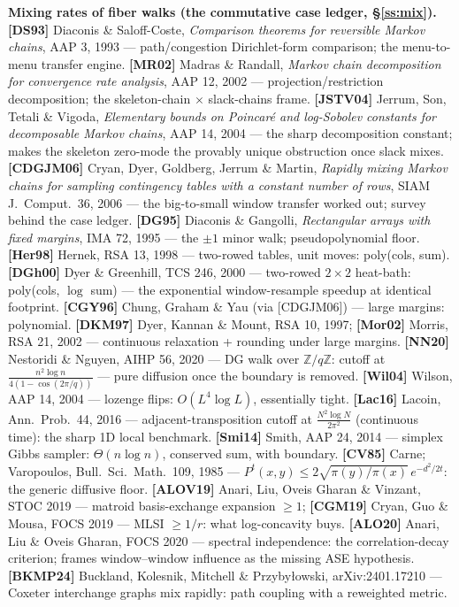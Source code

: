 \documentclass[11pt]{article}
\begin{document}
\textbf{Mixing rates of fiber walks (the commutative case ledger, \S\ref{ss:mix}).}
\textbf{[DS93]} Diaconis \& Saloff-Coste, \emph{Comparison theorems for reversible Markov chains},
AAP 3, 1993 --- path/congestion Dirichlet-form comparison; the menu-to-menu transfer engine.
\textbf{[MR02]} Madras \& Randall, \emph{Markov chain decomposition for convergence rate analysis},
AAP 12, 2002 --- projection/restriction decomposition; the skeleton-chain $\times$ slack-chains frame.
\textbf{[JSTV04]} Jerrum, Son, Tetali \& Vigoda, \emph{Elementary bounds on Poincar\'e and
log-Sobolev constants for decomposable Markov chains}, AAP 14, 2004 --- the sharp decomposition
constant; makes the skeleton zero-mode the provably unique obstruction once slack mixes.
\textbf{[CDGJM06]} Cryan, Dyer, Goldberg, Jerrum \& Martin, \emph{Rapidly mixing Markov chains for
sampling contingency tables with a constant number of rows}, SIAM J.\ Comput.\ 36, 2006 --- the
big-to-small window transfer worked out; survey behind the case ledger.
\textbf{[DG95]} Diaconis \& Gangolli, \emph{Rectangular arrays with fixed margins}, IMA 72, 1995 ---
the $\pm1$ minor walk; pseudopolynomial floor.
\textbf{[Her98]} Hernek, RSA 13, 1998 --- two-rowed tables, unit moves: poly(cols, sum).
\textbf{[DGh00]} Dyer \& Greenhill, TCS 246, 2000 --- two-rowed $2\times2$ heat-bath: poly(cols,
$\log$ sum) --- the exponential window-resample speedup at identical footprint.
\textbf{[CGY96]} Chung, Graham \& Yau (via [CDGJM06]) --- large margins: polynomial.
\textbf{[DKM97]} Dyer, Kannan \& Mount, RSA 10, 1997; \textbf{[Mor02]} Morris, RSA 21, 2002 ---
continuous relaxation + rounding under large margins.
\textbf{[NN20]} Nestoridi \& Nguyen, AIHP 56, 2020 --- DG walk over $\mathbb{Z}/q\mathbb{Z}$: cutoff
at $\frac{n^2\log n}{4(1-\cos(2\pi/q))}$ --- pure diffusion once the boundary is removed.
\textbf{[Wil04]} Wilson, AAP 14, 2004 --- lozenge flips: $O(L^4\log L)$, essentially tight.
\textbf{[Lac16]} Lacoin, Ann.\ Prob.\ 44, 2016 --- adjacent-transposition cutoff at
$\frac{N^2\log N}{2\pi^2}$ (continuous time): the sharp 1D local benchmark.
\textbf{[Smi14]} Smith, AAP 24, 2014 --- simplex Gibbs sampler: $\Theta(n\log n)$, conserved sum,
with boundary.
\textbf{[CV85]} Carne; Varopoulos, Bull.\ Sci.\ Math.\ 109, 1985 --- $P^t(x,y)\le
2\sqrt{\pi(y)/\pi(x)}\,e^{-d^2/2t}$: the generic diffusive floor.
\textbf{[ALOV19]} Anari, Liu, Oveis Gharan \& Vinzant, STOC 2019 --- matroid basis-exchange expansion
$\ge1$; \textbf{[CGM19]} Cryan, Guo \& Mousa, FOCS 2019 --- MLSI $\ge1/r$: what log-concavity buys.
\textbf{[ALO20]} Anari, Liu \& Oveis Gharan, FOCS 2020 --- spectral independence: the
correlation-decay criterion; frames window--window influence as the missing ASE hypothesis.
\textbf{[BKMP24]} Buckland, Kolesnik, Mitchell \& Przyby\l{}owski, arXiv:2401.17210 --- Coxeter
interchange graphs mix rapidly: path coupling with a reweighted metric.
\end{document}

